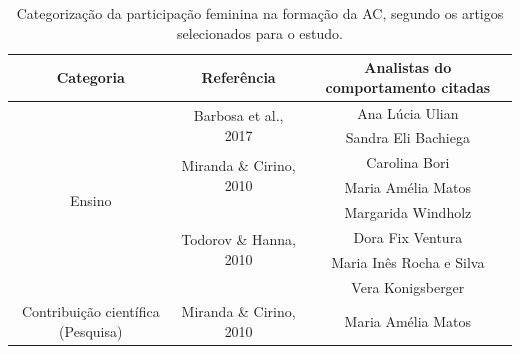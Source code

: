\begin{table}[]
\caption{Categorização da participação feminina na formação da AC, segundo os artigos selecionados para o estudo.}
\begin{adjustbox}{max width=1\textwidth}
\begin{tabular}{@{}ccc@{}}
\toprule
\textbf{Categoria}                                                         & \textbf{Referência}                                           & \textbf{Analistas do comportamento citadas} \\ \midrule
\multicolumn{1}{c|}{\multirow{8}{*}{Ensino}}                               & \multicolumn{1}{c|}{\multirow{2}{*}{Barbosa et al., 2017}}    & Ana Lúcia Ulian                             \\
\multicolumn{1}{c|}{}                                                      & \multicolumn{1}{c|}{}                                         & Sandra Eli Bachiega                         \\ \cmidrule(l){2-3} 
\multicolumn{1}{c|}{}                                                      & \multicolumn{1}{c|}{\multirow{2}{*}{Miranda \& Cirino, 2010}} & Carolina Bori                               \\
\multicolumn{1}{c|}{}                                                      & \multicolumn{1}{c|}{}                                         & Maria Amélia Matos                          \\ \cmidrule(l){2-3} 
\multicolumn{1}{c|}{}                                                      & \multicolumn{1}{c|}{\multirow{4}{*}{Todorov \& Hanna, 2010}}  & Margarida Windholz                          \\
\multicolumn{1}{c|}{}                                                      & \multicolumn{1}{c|}{}                                         & Dora Fix Ventura                            \\
\multicolumn{1}{c|}{}                                                      & \multicolumn{1}{c|}{}                                         & Maria Inês Rocha e Silva                    \\
\multicolumn{1}{c|}{}                                                      & \multicolumn{1}{c|}{}                                         & Vera Konigsberger                           \\ \midrule
\multicolumn{1}{c|}{\multirow{10}{*}{Contribuição científica (Pesquisa)}}  & \multicolumn{1}{c|}{\multirow{6}{*}{Miranda \& Cirino, 2010}} & Maria Amélia Matos                          \\

\end{tabular}
\end{adjustbox}
\end{table}
